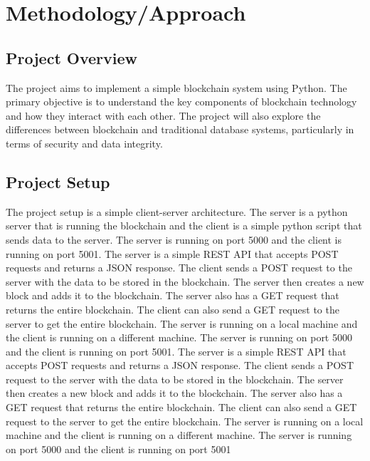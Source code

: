 \documentclass[conference]{IEEEtran} %
\begin{document}
\section{Methodology/Approach} %
\subsection{Project Overview} %
The project aims to implement a simple blockchain system using Python. The primary objective is to understand the key components of blockchain technology and how they interact with each other. The project will also explore the differences between blockchain and traditional database systems, particularly in terms of security and data integrity.
\subsection{Project Setup} %
The project setup is a simple client-server architecture. The server is a python server that is running the blockchain and the client is a simple python script that sends data to the server. The server is running on port 5000 and the client is running on port 5001. The server is a simple REST API that accepts POST requests and returns a JSON response. The client sends a POST request to the server with the data to be stored in the blockchain. The server then creates a new block and adds it to the blockchain.
The server also has a GET request that returns the entire blockchain. The client can also send a GET request to the server to get the entire blockchain. The server is running on a local machine and the client is running on a different machine. The server is running on port 5000 and the client is running on port 5001.
The server is a simple REST API that accepts POST requests and returns a JSON response. The client sends a POST request to the server with the data to be stored in the blockchain. The server then creates a new block and adds it to the blockchain. The server also has a GET request that returns the entire blockchain. The client can also send a GET request to the server to get the entire blockchain. The server is running on a local machine and the client is running on a different machine. The server is running on port 5000 and the client is running on port 5001
\end{document}
